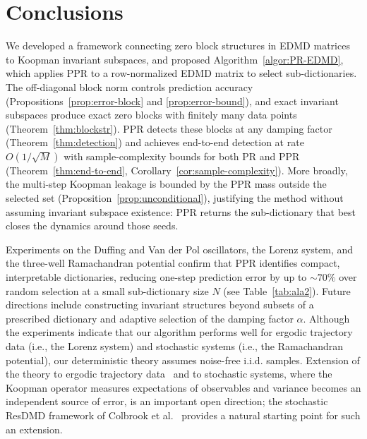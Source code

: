 \documentclass{article}
\theoremstyle{plain}
\theoremstyle{definition}
\newcommand{\arXivtag}[1][]{#1}
\begin{document}
	\vspace{-0.2cm}
\section{Conclusions}\label{sec:conclusions}
	\vspace{-0.3cm}
We developed a framework connecting zero block structures in EDMD matrices to Koopman invariant subspaces, and proposed Algorithm~\ref{algor:PR-EDMD}, which applies PPR to a row-normalized EDMD matrix to select sub-dictionaries. The off-diagonal block norm controls prediction accuracy \arXivtag[(Propositions~\ref{prop:error-block} and \ref{prop:error-bound})], and exact invariant subspaces produce exact zero blocks with finitely many data points (Theorem~\ref{thm:blockstr}). PPR detects these blocks at any damping factor (Theorem~\ref{thm:detection}) and achieves end-to-end detection at rate $O(1/\sqrt{M})$ with sample-complexity bounds for both PR and PPR (Theorem~\ref{thm:end-to-end}, Corollary~\ref{cor:sample-complexity}). More broadly, the multi-step Koopman leakage is bounded by the PPR mass outside the selected set (Proposition~\ref{prop:unconditional}), justifying the method without assuming invariant subspace existence: PPR returns the sub-dictionary that best closes the dynamics around those seeds. 

Experiments on the Duffing and Van der Pol oscillators, the Lorenz system, and the three-well Ramachandran potential confirm that PPR identifies compact, interpretable dictionaries, reducing one-step prediction error by up to $\sim 70\%$ over random selection at \arXivtag[a small sub-dictionary size] $N$ (see Table~\ref{tab:ala2}).
Future directions include constructing invariant structures beyond subsets of a prescribed dictionary and adaptive selection of the damping factor $\alpha$. Although the experiments indicate that our algorithm performs well for ergodic trajectory data (i.e., the Lorenz system) and stochastic systems (i.e., the Ramachandran potential), our deterministic theory assumes noise-free i.i.d. samples. Extension of the theory to ergodic trajectory data~\cite{nuske2023finite, elias2024datadriven} and to stochastic systems, where the Koopman operator measures expectations of observables and variance becomes an independent source of error, is an important open direction; the stochastic ResDMD framework of Colbrook et al.~\cite{colbrook2024beyond} provides a natural starting point for such an extension.
\end{document}
